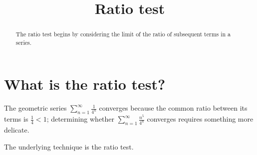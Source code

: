 \documentclass{ximera}
\title{Ratio test}
\begin{document}
\begin{abstract}
  The ratio test begins by considering the limit of the ratio of subsequent terms in a series.
\end{abstract}

\maketitle

\section{What is the ratio test?}

The geometric series \(\displaystyle\sum_{n=1}^\infty \displaystyle\frac{1}{4^n}\) converges because the common ratio between its terms is \(\displaystyle\frac{1}{4} < 1\); determining whether \(\displaystyle\sum_{n=1}^\infty \displaystyle\frac{n^5}{4^n}\) converges requires something more delicate.


The underlying technique is the ratio test.

\end{document}
